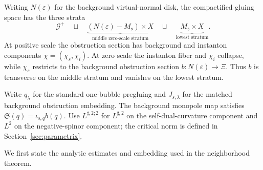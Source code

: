 \documentclass[11pt]{amsart}
\theoremstyle{definition}
\theoremstyle{remark}
\theoremstyle{plain}
\newcommand{\cG}{\mathcal{G}}
\begin{document}
Writing $N(\varepsilon)$ for the background virtual-normal disk, the
compactified gluing space has the three strata
\begin{equation}\label{eq:intro-three-strata}
 \cG^+\quad\sqcup\quad
 \underbrace{(N(\varepsilon)-M_{\mathfrak s})\times X}_{\text{middle
 zero-scale stratum}}\quad\sqcup\quad
 \underbrace{M_{\mathfrak s}\times X}_{\text{lowest stratum}}.
\end{equation}
At positive scale the obstruction section has background and instanton
components $\chi=(\chi_s,\chi_i)$.  At zero scale the instanton fiber and
$\chi_i$ collapse, while $\chi_s$ restricts to the background obstruction
section $b:N(\varepsilon)\to\Xi$.  Thus $b$ is transverse on the middle
stratum and vanishes on the lowest stratum.

Write $q_\lambda$ for the standard one-bubble pregluing and
$J_{s,\lambda}$ for the matched background obstruction embedding.
The background monopole map satisfies
$\mathfrak S(q)=\iota_{s,q}b(q)$.  Use $L^{\sharp,2;2}$ for
$L^{\sharp,2}$ on the self-dual-curvature component and $L^2$ on the
negative-spinor component; the critical norm is defined in
Section~\ref{sec:parametrix}.

We first state the analytic estimates and embedding used in the
neighborhood theorem.
\end{document}
